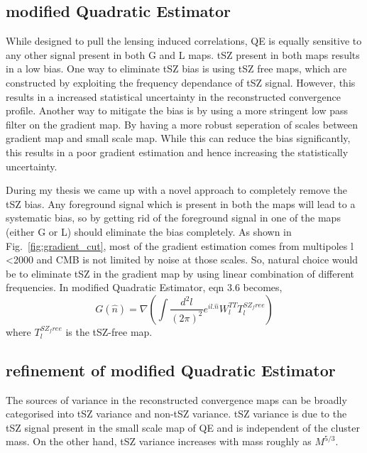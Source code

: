 \subsection{modified Quadratic Estimator}
While designed to pull the lensing induced correlations, QE is equally sensitive to any other signal present in both G and L maps.
 tSZ present in both maps results in a low bias.
 One way to eliminate tSZ bias is using tSZ free maps, which are constructed by exploiting the frequency dependance of tSZ signal.
 However, this results in a increased statistical uncertainty in the reconstructed convergence profile.
 Another way to mitigate the bias is by using a more stringent low pass filter on the gradient map. %
 By having a more robust seperation of scales between gradient map and small scale map.
 While this can reduce the bias significantly, this results in a poor gradient estimation and hence increasing the statistically uncertainty.

 
 During my thesis we came up with a novel approach to completely remove the tSZ bias. 
 Any foreground signal which is present in both the maps will lead to a systematic bias, so by getting rid of the foreground signal in one of the maps (either G or L) should eliminate the bias completely.
  As shown in Fig.~\ref{fig:gradient_cut}, most of the gradient estimation comes from multipoles l <2000 and CMB is not limited by noise at those scales.
  So, natural choice would be to eliminate tSZ in the gradient map by using linear combination of different frequencies. 
  In modified Quadratic Estimator, eqn 3.6 becomes,
  \begin{equation}
   G(\hat{n}) = \nabla (\int\frac{d^{2}l}{(2\pi)^{2}} e^{il .\hat{n}} W^{TT}_{l} T^{SZ_free}_{l}   )
  \end{equation}
  where $T^{SZ_free}_{l} $ is the tSZ-free map.
  \subsection{refinement of modified Quadratic Estimator}
  The sources of variance in the reconstructed convergence maps can be broadly categorised into tSZ variance and non-tSZ variance.
  tSZ variance is due to the tSZ signal present in the small scale map of QE and is independent of the cluster mass.
 On the other hand, tSZ variance increases with mass roughly as $M^{5/3}$.
  
